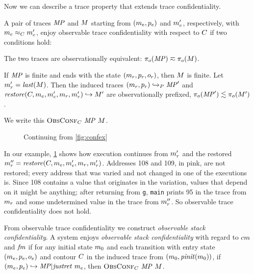 \documentclass[acmsmall,review,anonymous]{acmart}\settopmatter{printfolios=true,printccs=false,printacmref=false}
\begin{document}
      Now we can describe a trace property that extends trace confidentiality.


      A pair of traces \(\mathit{MP}\) and \(M\) starting from
      \((m_e,p_e)\) and \(m_e'\), respectively, with
      \(m_e \approx_C m_e'\), enjoy observable trace
      confidentiality with respect to \(C\) if two conditions hold:

      The two traces are observationally equivalent: \(\pi_o(\mathit{MP}) \eqsim
      \pi_o(M)\).

      If \(\mathit{MP}\) is finite and ends with the state
      \((m_r,p_r,o_r)\), then \(M\) is finite. Let
      \(m_r' = \mathit{last}(M)\). Then the induced traces
      \((m_r,p_r) \hookrightarrow_P \mathit{MP}'\) and
      \(\mathit{restore}(C,m_e,m_e',m_r,m_r')
      \hookrightarrow M'\) are observationally prefixed,
      \(\pi_o(\mathit{MP}') \lesssim \pi_o(M')\).

      We write this \(\text{\sc ObsConf}_C ~ \mathit{MP} ~ M\).
      
      \begin{figure}
        \confidentialitylazyexample
        \caption{Continuing from \cref{fig:confex}}
        \label{fig:conflex}
      \end{figure}

      In our example, \cref{fig:conflex} shows how execution continues from
      \(m_r'\) and the restored \(m_r'' = \mathit{restore}(C,
      m_e,m_e',m_r,m_r')\). Addresses 108 and 109, in pink, are
      not restored; every address that was varied and not changed in one of the
      executions is. Since 108 contains a value that originates in the
      variation, values that depend on it might be anything; after returning
      from {\tt g}, {\tt main} prints 95 in the trace from \(m_r\) and
      some undetermined value in the trace from \(m_r''\). So observable
      trace confidentiality does not hold.


      From observable trace confidentiality we construct {\em observable stack
      confidentiality}. A system enjoys {\em observable stack confidentiality}
      with regard to \(cm\) and \(\mathit{fm}\) if for any initial state
      \(m_0\) and each transition with entry state
      \((m_e,p_e,o_e)\) and contour \(C\) in the
      induced trace from \((m_0,\mathit{pinit}(m_0))\), if
      \((m_e,p_e) \hookrightarrow \mathit{MP} | \mathit{justret}\ m_e\),
      then \(\text{\sc ObsConf}_C ~ \mathit{MP} ~ M\).
\end{document}
